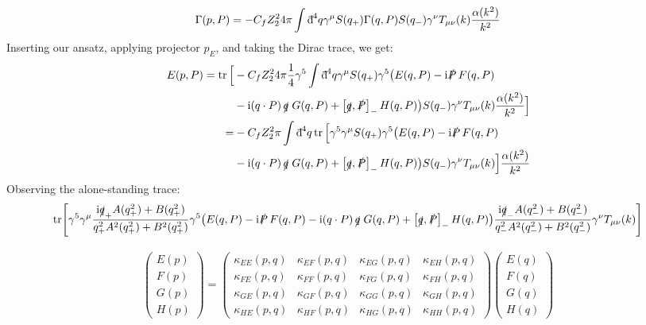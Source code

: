 \documentclass[oneside, openany]{book}
\numberwithin{equation}{chapter}
\numberwithin{figure}{chapter}
\newcommand{\ii}{\mathrm{i}}
\newcommand{\dbar}{\mathord{\mathrm{d}\mkern-8mu\raisebox{0.55em}{\rule{0.38em}{0.05em}}\mkern0.1mu}}
\newcommand{\q}[0]{\slashed{q}}
\newcommand{\g}[0]{\gamma}
\begin{document}
\begin{align}
	\Gamma(p,P) = -C_f Z_2^2 4\pi \int \dbar^4 q \g^\mu S(q_+) \Gamma(q,P) S(q_-) \g^\nu T_{\mu\nu}(k) \frac{\alpha(k^2)}{k^2}
\end{align}
Inserting our ansatz, applying projector $p_E$, and taking the Dirac trace, we get:
\begin{align}
	E(p,P) = \tr\Big[&-C_f Z_2^2 4\pi \frac{1}{4} \g^5 \int \dbar^4 q \g^\mu S(q_+) \g^5 \big( E(q,P) - \ii \slashed P \, F(q,P) \notag\\
	& - \ii (q\cdot P) \,\q\; G(q,P) + \left[\q, \slashed P\right]_- H(q,P)  \big) S(q_-) \g^\nu T_{\mu\nu}(k) \frac{\alpha(k^2)}{k^2}\Big] \\
	= &-C_f Z_2^2 \pi \int \dbar^4 q \tr\Big[ \g^5 \g^\mu S(q_+) \g^5 \big( E(q,P) - \ii \slashed P \, F(q,P) \notag\\
	& - \ii (q\cdot P) \,\q\; G(q,P) + \left[\q, \slashed P\right]_- H(q,P)  \big) S(q_-) \g^\nu T_{\mu\nu}(k) \Big] \frac{\alpha(k^2)}{k^2}
\end{align}
Observing the alone-standing trace:
\begin{align}
	\tr[ \g^5 \g^\mu \frac{\ii \q_+ A(q_+^2) + B(q_+^2)}{q_+^2 A^2(q_+^2) + B^2(q_+^2)} \g^5 \big( E(q,P) - \ii \slashed P \, F(q,P) - \ii (q\cdot P) \,\q\; G(q,P) + \left[\q, \slashed P\right]_- H(q,P)  \big) \frac{\ii \q_- A(q_-^2) + B(q_-^2)}{q_-^2 A^2(q_-^2) + B^2(q_-^2)} \g^\nu T_{\mu\nu}(k)]
\end{align}

\begin{align}
	\begin{pmatrix}
		E(p) \\
		F(p) \\
		G(p) \\
		H(p)
	\end{pmatrix}
	=
	\begin{pmatrix}
		\kappa_{EE}(p,q) & \kappa_{EF}(p,q) & \kappa_{EG}(p,q) & \kappa_{EH}(p,q) \\
		\kappa_{FE}(p,q) & \kappa_{FF}(p,q) & \kappa_{FG}(p,q) & \kappa_{FH}(p,q) \\
		\kappa_{GE}(p,q) & \kappa_{GF}(p,q) & \kappa_{GG}(p,q) & \kappa_{GH}(p,q) \\
		\kappa_{HE}(p,q) & \kappa_{HF}(p,q) & \kappa_{HG}(p,q) & \kappa_{HH}(p,q)
	\end{pmatrix}
	\begin{pmatrix}
		E(q) \\
		F(q) \\
		G(q) \\
		H(q)
	\end{pmatrix}
\end{align}
\end{document}
